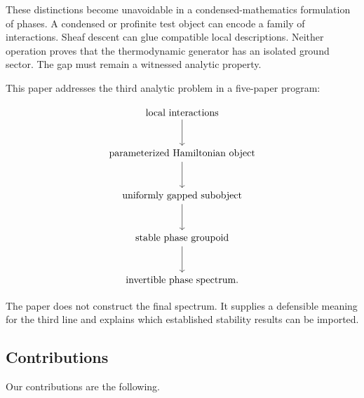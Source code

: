 \documentclass[12pt]{article}
\theoremstyle{definition}
\theoremstyle{remark}
\begin{document}
These distinctions become unavoidable in a condensed-mathematics formulation
of phases. A condensed or profinite test object can encode a family of
interactions. Sheaf descent can glue compatible local descriptions. Neither
operation proves that the thermodynamic generator has an isolated ground
sector. The gap must remain a witnessed analytic property.

This paper addresses the third analytic problem in a five-paper program:

\[
\begin{tikzcd}[row sep=large]
\text{local interactions}
  \arrow[d]
\\
\text{parameterized Hamiltonian object}
  \arrow[d]
\\
\text{uniformly gapped subobject}
  \arrow[d]
\\
\text{stable phase groupoid}
  \arrow[d]
\\
\text{invertible phase spectrum.}
\end{tikzcd}
\]

The paper does not construct the final spectrum. It supplies a defensible
meaning for the third line and explains which established stability results
can be imported.

\subsection{Contributions}

Our contributions are the following.
\end{document}
